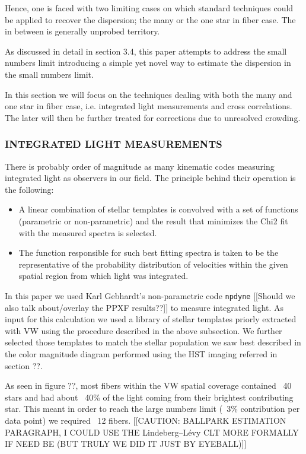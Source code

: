\documentclass[%
 aip,
 twocolumn,
 jmp,%
 amsmath,amssymb,
 reprint,%
]{aastex61}
\begin{document}
Hence, one is faced with two limiting cases on which standard techniques could be applied to recover the dispersion; the many or the one star in fiber case. The in between is generally unprobed territory.

As discussed in detail in section 3.4, this paper attempts to address the small numbers limit introducing a simple yet novel way to estimate the dispersion in the small numbers limit.

In this section we will focus on the techniques dealing with both the many and one star in fiber case, i.e. integrated light measurements and cross correlations. The later will then be further treated for corrections due to unresolved crowding.

\subsubsection{INTEGRATED LIGHT MEASUREMENTS}

There is probably order of magnitude as many kinematic codes measuring integrated light as observers in our field. The principle behind their operation is the following: 
\begin{itemize}
\item A linear combination of stellar templates is convolved with a set of functions (parametric or non-parametric) and the result that minimizes the Chi2 fit with the measured spectra is selected.
\item The function responsible for such best fitting spectra is taken to be the representative of the probability distribution of velocities within the given spatial region from which light was integrated.
\end{itemize}
In this paper we used Karl Gebhardt's non-parametric code \texttt{npdyne} [[Should we also talk about/overlay the PPXF results??]] to measure integrated light. As input for this calculation we used a library of stellar templates priorly extracted with VW using the procedure described in the above subsection. We further selected those templates to match the stellar population we saw best described in the color magnitude diagram performed using the HST imaging referred in section ??.

As seen in figure ??, most fibers within the VW spatial coverage contained ~40 stars and had about ~40\% of the light coming from their brightest contributing star. This meant in order to reach the large numbers limit (~3\% contribution per data point) we required ~12 fibers. [[CAUTION: BALLPARK ESTIMATION PARAGRAPH, I COULD USE THE Lindeberg–Lévy CLT MORE FORMALLY IF NEED BE (BUT TRULY WE DID IT JUST BY EYEBALL)]]
\end{document}
